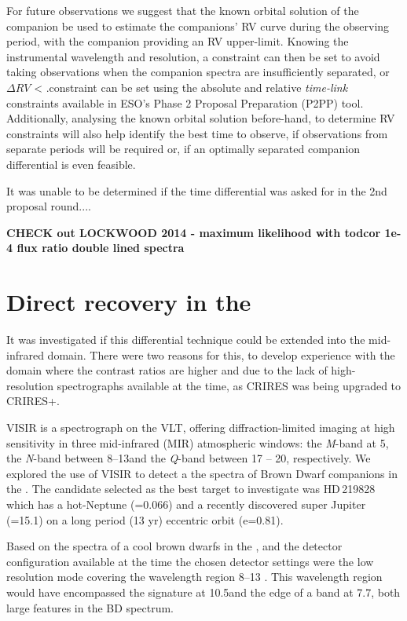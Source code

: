 For future observations we suggest that the known orbital solution of the companion be used to estimate the companions' {RV} curve during the observing period, with the companion \mtwosini{} providing an {RV} upper-limit.
Knowing the instrumental wavelength and resolution, a constraint can then be set to avoid taking observations when the companion spectra are insufficiently separated, or \(\Delta {RV}\) < {\fwhm}.\@This constraint can be set using the absolute and relative \emph{time-link} constraints available in {ESO}'s {Phase 2 Proposal Preparation} (P2PP) tool.
Additionally, analysing the known orbital solution before-hand, to determine {RV} constraints will also help identify the best time to observe, if observations from separate periods will be required or, if an optimally separated companion differential is even feasible.


It was unable to be determined if the time differential was asked for in the 2nd proposal round....




\textbf{
CHECK out LOCKWOOD 2014 - maximum likelihood with todcor 1e-4 flux ratio double lined spectra}




\section{Direct recovery in the \mir{}}
It was investigated if this differential technique could be extended into the mid-infrared {\mir{}} domain.
There were two reasons for this, to develop experience with the {\mir{}} domain where the contrast ratios are higher and due to the lack of high-resolution \nir{} spectrographs available at the time, as {CRIRES} was being upgraded to {CRIRES+}.

{VISIR} is a \mir{} spectrograph on the {VLT}, offering diffraction-limited imaging at high sensitivity in three mid-infrared (MIR) atmospheric windows: the \emph{M}-band at 5\um, the \emph{N}-band between 8--13\um and the \emph{Q}-band between 17 -- 20\um, respectively.
We explored the use of {VISIR} to detect a the spectra of Brown Dwarf companions in the {\mir{}}. The candidate selected as the best target to investigate was {HD\,219828} which has a hot-Neptune (\mtwosini{}=0.066\Mjup) \citep{melo 2007} and a recently discovered super Jupiter (\mtwosini{}=15.1\Mjup) on a long period (13 yr) eccentric orbit (e=0.81)\citep{santos 2016}.

Based on the spectra of a cool brown dwarfs in the \mir{}, and the detector configuration available at the time the chosen detector settings were the low resolution mode covering the wavelength region 8--13 \um. This wavelength region would have encompassed the  signature at 10.5\um and the edge of  a  band at 7.7\um, both large features in the BD \mir{} spectrum.

